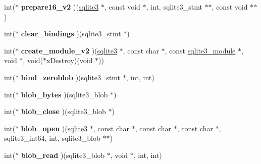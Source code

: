 \begin{DoxyCompactItemize}
\item 
int($\ast$ {\bfseries prepare16\+\_\+v2} )(\hyperlink{structsqlite3}{sqlite3} $\ast$, const void $\ast$, int, sqlite3\+\_\+stmt $\ast$$\ast$, const void $\ast$$\ast$)\hypertarget{structsqlite3__api__routines_aa2ac35f69a60c329e4129dd67f7c5662}{}\label{structsqlite3__api__routines_aa2ac35f69a60c329e4129dd67f7c5662}

\item 
int($\ast$ {\bfseries clear\+\_\+bindings} )(sqlite3\+\_\+stmt $\ast$)\hypertarget{structsqlite3__api__routines_a6154fab4f9101c9ababb806dac91d01f}{}\label{structsqlite3__api__routines_a6154fab4f9101c9ababb806dac91d01f}

\item 
int($\ast$ {\bfseries create\+\_\+module\+\_\+v2} )(\hyperlink{structsqlite3}{sqlite3} $\ast$, const char $\ast$, const \hyperlink{structsqlite3__module}{sqlite3\+\_\+module} $\ast$, void $\ast$, void($\ast$x\+Destroy)(void $\ast$))\hypertarget{structsqlite3__api__routines_ad95940b07bd59f087160cf3a3428c8fa}{}\label{structsqlite3__api__routines_ad95940b07bd59f087160cf3a3428c8fa}

\item 
int($\ast$ {\bfseries bind\+\_\+zeroblob} )(sqlite3\+\_\+stmt $\ast$, int, int)\hypertarget{structsqlite3__api__routines_a1a1257f2722e96c06e8db5aa22aebddb}{}\label{structsqlite3__api__routines_a1a1257f2722e96c06e8db5aa22aebddb}

\item 
int($\ast$ {\bfseries blob\+\_\+bytes} )(sqlite3\+\_\+blob $\ast$)\hypertarget{structsqlite3__api__routines_a435b470368220faf25063c1a673952ea}{}\label{structsqlite3__api__routines_a435b470368220faf25063c1a673952ea}

\item 
int($\ast$ {\bfseries blob\+\_\+close} )(sqlite3\+\_\+blob $\ast$)\hypertarget{structsqlite3__api__routines_a7b7749cb4e412443b7903205c0ebacf2}{}\label{structsqlite3__api__routines_a7b7749cb4e412443b7903205c0ebacf2}

\item 
int($\ast$ {\bfseries blob\+\_\+open} )(\hyperlink{structsqlite3}{sqlite3} $\ast$, const char $\ast$, const char $\ast$, const char $\ast$, sqlite3\+\_\+int64, int, sqlite3\+\_\+blob $\ast$$\ast$)\hypertarget{structsqlite3__api__routines_abec3f9100c800aaac49c7eb881f24d4c}{}\label{structsqlite3__api__routines_abec3f9100c800aaac49c7eb881f24d4c}

\item 
int($\ast$ {\bfseries blob\+\_\+read} )(sqlite3\+\_\+blob $\ast$, void $\ast$, int, int)\hypertarget{structsqlite3__api__routines_a916f53dfaedab13e9fcf33c80b10c341}{}\label{structsqlite3__api__routines_a916f53dfaedab13e9fcf33c80b10c341}


\end{DoxyCompactItemize}
